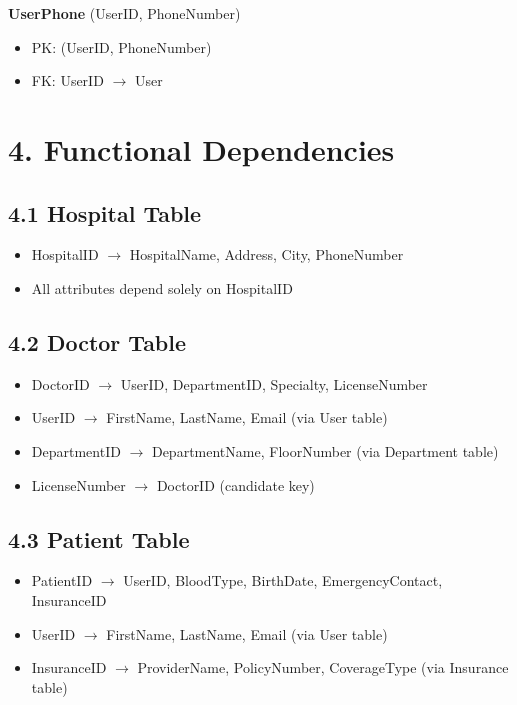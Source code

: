 \textbf{UserPhone} (UserID, PhoneNumber)
\begin{itemize}
    \item PK: (UserID, PhoneNumber)
    \item FK: UserID $\rightarrow$ User
\end{itemize}

\newpage
\section{4. Functional Dependencies}

\subsection*{4.1 Hospital Table}

\begin{itemize}
    \item HospitalID $\rightarrow$ HospitalName, Address, City, PhoneNumber
    \item All attributes depend solely on HospitalID
\end{itemize}

\subsection*{4.2 Doctor Table}

\begin{itemize}
    \item DoctorID $\rightarrow$ UserID, DepartmentID, Specialty, LicenseNumber
    \item UserID $\rightarrow$ FirstName, LastName, Email (via User table)
    \item DepartmentID $\rightarrow$ DepartmentName, FloorNumber (via Department table)
    \item LicenseNumber $\rightarrow$ DoctorID (candidate key)
\end{itemize}

\subsection*{4.3 Patient Table}

\begin{itemize}
    \item PatientID $\rightarrow$ UserID, BloodType, BirthDate, EmergencyContact, InsuranceID
    \item UserID $\rightarrow$ FirstName, LastName, Email (via User table)
    \item InsuranceID $\rightarrow$ ProviderName, PolicyNumber, CoverageType (via Insurance table)
\end{itemize}

